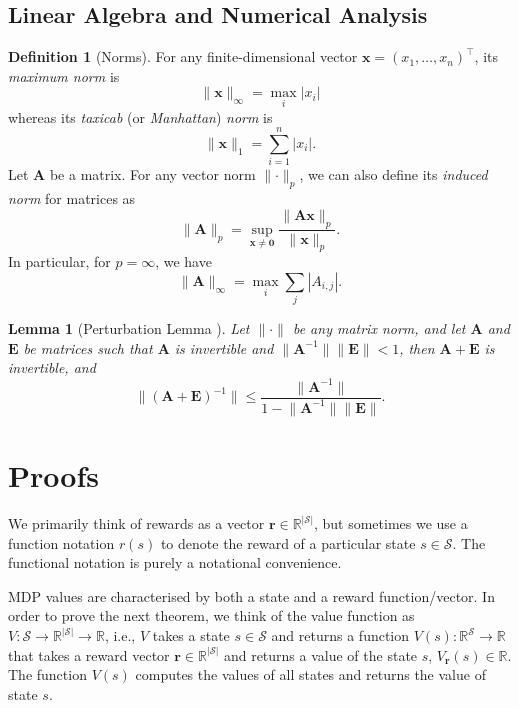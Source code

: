 \documentclass{article}
\newtheorem{lemma}[theorem]{Lemma}
\theoremstyle{definition}
\newtheorem{definition}[theorem]{Definition}
\theoremstyle{remark}
\begin{document}
\subsection{Linear Algebra and Numerical Analysis}

\begin{definition}[Norms]
  For any finite-dimensional vector $\mathbf{x} = (x_1, \dots, x_n)^\intercal$,
  its \emph{maximum norm} is
  \[
    \lVert \mathbf{x} \rVert_\infty = \max_i |x_i|
  \]
  whereas its \emph{taxicab} (or \emph{Manhattan}) \emph{norm} is
  \[
    \lVert \mathbf{x} \rVert_1 = \sum_{i = 1}^n |x_i|.
  \]
  Let $\mathbf{A}$ be a matrix. For any vector norm $\lVert
  \cdot \rVert_p$, we can also define its \emph{induced norm} for matrices as
  \[
    \lVert \mathbf{A} \rVert_p = \sup_{\mathbf{x} \ne \mathbf{0}} \frac{\lVert
      \mathbf{Ax} \rVert_p}{\lVert \mathbf{x} \rVert_p}.
  \]
  In particular, for $p = \infty$, we have
  \[
    \lVert \mathbf{A} \rVert_\infty = \max_i \sum_{j} |A_{i,j}|.
  \]
\end{definition}

\begin{lemma}[Perturbation Lemma
  \cite{layton2014numerical}] \label{prop:condition_number}
  Let $\lVert \cdot \rVert$ be any matrix norm, and let $\mathbf{A}$ and
  $\mathbf{E}$ be matrices such that $\mathbf{A}$ is invertible and $\lVert
  \mathbf{A}^{-1} \rVert \lVert \mathbf{E} \rVert < 1$, then $\mathbf{A} +
  \mathbf{E}$ is invertible, and
  \[
    \lVert (\mathbf{A} + \mathbf{E})^{-1} \rVert \le \frac{\lVert
      \mathbf{A}^{-1} \rVert}{1 - \lVert \mathbf{A}^{-1} \rVert \lVert
      \mathbf{E} \rVert}.
  \]
\end{lemma}

\section{Proofs}

We primarily think of rewards as a vector $\mathbf{r} \in
\mathbb{R}^{|\mathcal{S}|}$, but sometimes we use a function notation $r(s)$ to
denote the reward of a particular state $s \in \mathcal{S}$. The functional
notation is purely a notational convenience.

MDP values are characterised by both a state and a reward function/vector. In
order to prove the next theorem, we think of the value function as $V :
\mathcal{S} \to \mathbb{R}^{|\mathcal{S}|} \to \mathbb{R}$, i.e., $V$ takes a
state $s \in \mathcal{S}$ and returns a function $V(s) :
\mathbb{R}^{\mathcal{S}} \to \mathbb{R}$ that takes a reward vector $\mathbf{r}
\in \mathbb{R}^{|\mathcal{S}|}$ and returns a value of the state $s$,
$V_{\mathbf{r}}(s) \in \mathbb{R}$. The function $V(s)$ computes the values of
all states and returns the value of state $s$.
\end{document}
